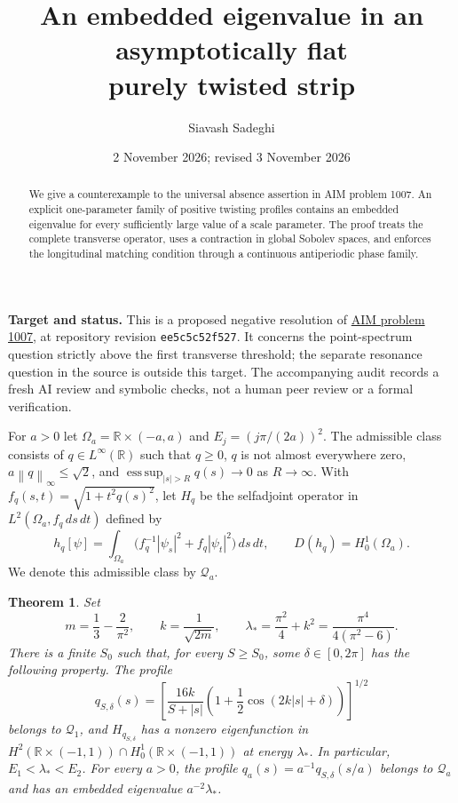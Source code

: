 \documentclass[11pt,a4paper]{article}
\title{An embedded eigenvalue in an asymptotically flat\protect\\purely twisted strip}
\author{Siavash Sadeghi}
\date{2 November 2026; revised 3 November 2026}
\newtheorem{theorem}{Theorem}
\newcommand{\R}{\mathbb R}
\newcommand{\norm}[1]{\left\lVert#1\right\rVert}
\newcommand{\mathscr}{\mathcal}
\begin{document}
\maketitle
\begin{abstract}
We give a counterexample to the universal absence assertion in AIM problem 1007. An explicit one-parameter family of positive twisting profiles contains an embedded eigenvalue for every sufficiently large value of a scale parameter. The proof treats the complete transverse operator, uses a contraction in global Sobolev spaces, and enforces the longitudinal matching condition through a continuous antiperiodic phase family.
\end{abstract}

\noindent\textbf{Target and status.}
This is a proposed negative resolution of
\href{https://github.com/MColbrook/AIM/blob/ee5c5c52f527db2f310cb0734bbebc9f7b95aac8/problems/1007-embedded-eigenvalues-in-asymptotically-flat-twisted-strips.md}{AIM problem 1007},
at repository revision \texttt{ee5c5c52f527}. It concerns the
point-spectrum question strictly above the first transverse threshold;
the separate resonance question in the source is outside this target.
The accompanying audit records a fresh AI review and symbolic checks,
not a human peer review or a formal verification.

For $a>0$ let $\Omega_a=\R\times(-a,a)$ and
$E_j=(j\pi/(2a))^2$. The admissible class consists of
$q\in L^\infty(\R)$ such that $q\ge0$, $q$ is not almost everywhere zero,
$a\norm q_\infty\le\sqrt2$, and
$\operatorname*{ess\,sup}_{|s|>R}q(s)\to0$ as $R\to\infty$.
With $f_q(s,t)=\sqrt{1+t^2q(s)^2}$, let $H_q$ be the selfadjoint operator
in $L^2(\Omega_a,f_q\,ds\,dt)$ defined by
\[
 h_q[\psi]=\int_{\Omega_a}
   \bigl(f_q^{-1}|\psi_s|^2+f_q|\psi_t|^2\bigr)\,ds\,dt,
 \qquad D(h_q)=H_0^1(\Omega_a).
\]
We denote this admissible class by $\mathscr Q_a$.

\begin{theorem}\label{thm:main}
Set
\[
 m=\frac13-\frac2{\pi^2},\qquad
 k=\frac1{\sqrt{2m}},\qquad
 \lambda_*=\frac{\pi^2}{4}+k^2=\frac{\pi^4}{4(\pi^2-6)}.
\]
There is a finite $S_0$ such that, for every $S\ge S_0$, some
$\delta\in[0,2\pi]$ has the following property. The profile
\begin{equation}\label{eq:profile}
 q_{S,\delta}(s)
 =\left[\frac{16k}{S+|s|}
     \left(1+\frac12\cos(2k|s|+\delta)\right)\right]^{1/2}
\end{equation}
belongs to $\mathscr Q_1$, and $H_{q_{S,\delta}}$ has a nonzero eigenfunction
in $H^2(\R\times(-1,1))\cap H_0^1(\R\times(-1,1))$ at energy $\lambda_*$.
In particular, $E_1<\lambda_*<E_2$.
For every $a>0$, the profile $q_a(s)=a^{-1}q_{S,\delta}(s/a)$ belongs to
$\mathscr Q_a$ and has an embedded eigenvalue $a^{-2}\lambda_*$.
\end{theorem}
\end{document}
